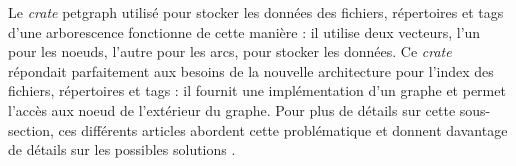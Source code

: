 \bigbreak
Le \textit{crate} petgraph utilisé pour stocker les données des fichiers, répertoires et tags d'une 
arborescence fonctionne de cette manière : il utilise deux vecteurs, l'un pour les noeuds, l'autre 
pour les arcs, pour stocker les données. Ce \textit{crate} répondait parfaitement aux besoins de 
la nouvelle architecture pour l'index des fichiers, répertoires et tags : il fournit une implémentation 
d'un graphe et permet l'accès aux noeud de l'extérieur du graphe.
Pour plus de détails sur cette sous-section, ces différents articles abordent cette problématique 
et donnent davantage de détails sur les possibles solutions \cite{ref2} \cite{ref26} \cite{ref49} 
\cite{ref46} \cite{ref47} \cite{ref48}.

\newpage
